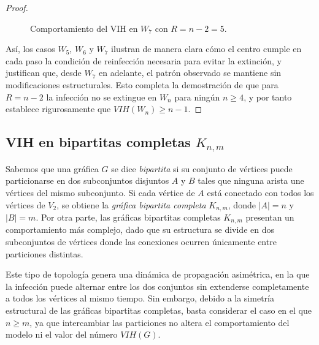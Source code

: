 \documentclass[12pt,titlepage,twoside,openright]{book}
\begin{document}
\begin{proof}
\begin{figure}[h]
    \caption{Comportamiento del VIH en $W_7$ con $R=n-2=5$.}
    \label{W7yR=5}
    \end{figure}
    As\'i, los casos $W_5$, $W_6$ y $W_7$ ilustran de manera clara c\'omo el centro cumple en cada paso la condici\'on de reinfecci\'on necesaria para evitar la extinci\'on, y justifican que, desde $W_7$ en adelante, el patr\'on observado se mantiene sin modificaciones estructurales. Esto completa la demostraci\'on de que para $R=n-2$ la infecci\'on no se extingue en $W_n$ para ning\'un $n\ge 4$, y por tanto establece rigurosamente que $VIH(W_n)\ge n-1$.
\end{proof}

\subsection{VIH en bipartitas completas $K_{n,m}$}
Sabemos que una gr\'afica $G$ se dice \textit{bipartita} si su conjunto de v\'ertices puede particionarse en dos subconjuntos disjuntos $A$ y $B$ tales que ninguna arista une v\'ertices del mismo subconjunto. Si cada v\'ertice de $A$ est\'a conectado con todos los v\'ertices de $V_2$, se obtiene la \textit{gr\'afica bipartita completa} $K_{n,m}$, donde $|A| = n$ y $|B| = m$. Por otra parte, las gr\'aficas bipartitas completas $K_{n,m}$ presentan un comportamiento m\'as complejo, dado que su estructura se divide en dos subconjuntos de v\'ertices donde las conexiones ocurren \'unicamente entre particiones distintas.

Este tipo de topolog\'ia genera una din\'amica de propagaci\'on asim\'etrica, en la que la infecci\'on puede alternar entre los dos conjuntos sin extenderse completamente a todos los v\'ertices al mismo tiempo. Sin embargo, debido a la simetr\'ia estructural de las gr\'aficas bipartitas completas, basta considerar el caso en el que $n \geq m$, ya que intercambiar las particiones no altera el comportamiento del modelo ni el valor del n\'umero $VIH(G)$.
\end{document}
